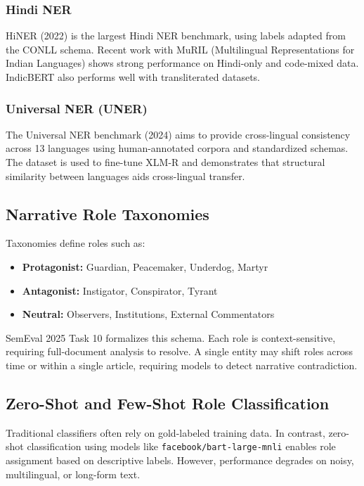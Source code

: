 \documentclass[12pt]{article}
\begin{document}
\subsubsection{Hindi NER}

HiNER (2022) is the largest Hindi NER benchmark, using labels adapted from the CONLL schema. Recent work with MuRIL (Multilingual Representations for Indian Languages) shows strong performance on Hindi-only and code-mixed data. IndicBERT also performs well with transliterated datasets.

\subsubsection{Universal NER (UNER)}

The Universal NER benchmark (2024) aims to provide cross-lingual consistency across 13 languages using human-annotated corpora and standardized schemas. The dataset is used to fine-tune XLM-R and demonstrates that structural similarity between languages aids cross-lingual transfer.

\subsection{Narrative Role Taxonomies}

Taxonomies define roles such as:
\begin{itemize}
    \item \textbf{Protagonist:} Guardian, Peacemaker, Underdog, Martyr
    \item \textbf{Antagonist:} Instigator, Conspirator, Tyrant
    \item \textbf{Neutral:} Observers, Institutions, External Commentators
\end{itemize}

SemEval 2025 Task 10 formalizes this schema. Each role is context-sensitive, requiring full-document analysis to resolve. A single entity may shift roles across time or within a single article, requiring models to detect narrative contradiction.

\subsection{Zero-Shot and Few-Shot Role Classification}

Traditional classifiers often rely on gold-labeled training data. In contrast, zero-shot classification using models like \texttt{facebook/bart-large-mnli} enables role assignment based on descriptive labels. However, performance degrades on noisy, multilingual, or long-form text.
\end{document}
